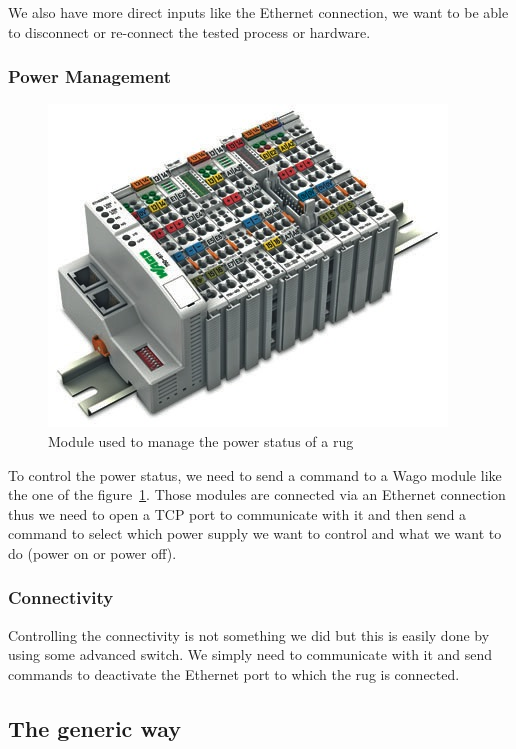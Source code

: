 \documentclass[12pt]{article}
\theoremstyle{definition}
\theoremstyle{definition}
\theoremstyle{remark}
\begin{document}
We also have more direct inputs like the Ethernet connection, we want to be able to disconnect or re-connect the tested process or hardware.

\subsubsection{Power Management}

\begin{figure}
    \centering
    \includegraphics[scale=0.6]{wago_module}
    \caption{Module used to manage the power status of a \gls{rug}}
    \label{wago}
\end{figure}

To control the power status, we need to send a command to a Wago module like the one of the figure~\ref{wago}. Those modules are connected via an Ethernet connection thus we need to open a TCP port to communicate with it and then send a command to select which power supply we want to control and what we want to do (power on or power off).

\subsubsection{Connectivity}

Controlling the connectivity is not something we did but this is easily done by using some advanced switch. We simply need to communicate with it and send commands to deactivate the Ethernet port to which the \gls{rug} is connected.

\subsection{The generic way}
\end{document}
